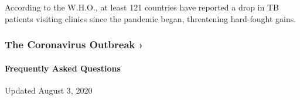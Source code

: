 According to the W.H.O., at least 121 countries have reported a drop in
TB patients visiting clinics since the pandemic began, threatening
hard-fought gains.

\href{https://www.nytimes3xbfgragh.onion/news-event/coronavirus?action=click\&pgtype=Article\&state=default\&region=MAIN_CONTENT_3\&context=storylines_faq}{}

\hypertarget{the-coronavirus-outbreak-}{%
\subsubsection{The Coronavirus Outbreak
›}\label{the-coronavirus-outbreak-}}

\hypertarget{frequently-asked-questions}{%
\paragraph{Frequently Asked
Questions}\label{frequently-asked-questions}}

Updated August 3, 2020

